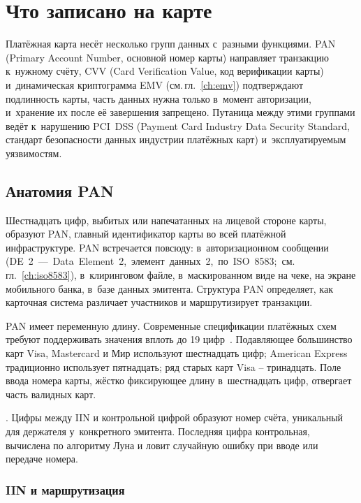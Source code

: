 
\chapter{Что записано на карте}\label{ch:card-data}
Платёжная карта несёт несколько групп данных с~разными функциями.
PAN (Primary Account Number, основной номер карты) направляет
транзакцию к~нужному счёту, CVV (Card Verification Value, код
верификации карты) и~динамическая криптограмма EMV
(см.\,гл.~\ref{ch:emv}) подтверждают подлинность карты, часть данных
нужна только в~момент авторизации, и~хранение их после её завершения
запрещено. Путаница между этими группами ведёт к~нарушению PCI~DSS
(Payment Card Industry Data Security Standard, стандарт безопасности
данных индустрии платёжных карт) и~эксплуатируемым уязвимостям.

\section{Анатомия PAN}\label{sec:card-data-pan}

Шестнадцать цифр, выбитых или напечатанных на лицевой стороне карты,
образуют PAN, главный идентификатор карты
во всей платёжной инфраструктуре. PAN встречается повсюду:
в~авторизационном сообщении \mbox{(DE~2~--- Data Element~2,
элемент данных~2, по ISO~8583; см.\,гл.~\ref{ch:iso8583})},
в~клиринговом файле, в~маскированном виде на чеке, на экране
мобильного банка, в~базе данных эмитента. Структура PAN
определяет, как карточная система различает участников
и маршрутизирует транзакции.

PAN имеет переменную длину. Современные спецификации платёжных схем
требуют поддерживать значения вплоть до 19 цифр~\cite{iso-7812-transition,visa-tadg}. Подавляющее большинство
карт Visa, Mastercard и Мир используют шестнадцать цифр; American
Express традиционно использует пятнадцать; ряд старых карт Visa --
тринадцать. Поле ввода номера карты, жёстко фиксирующее длину
в~шестнадцать цифр, отвергает часть валидных карт.

. Цифры между IIN и контрольной цифрой образуют
номер счёта, уникальный для держателя у~конкретного эмитента.
Последняя цифра контрольная, вычислена по алгоритму Луна
и ловит случайную ошибку при вводе или передаче номера.

\subsection*{IIN и маршрутизация}

